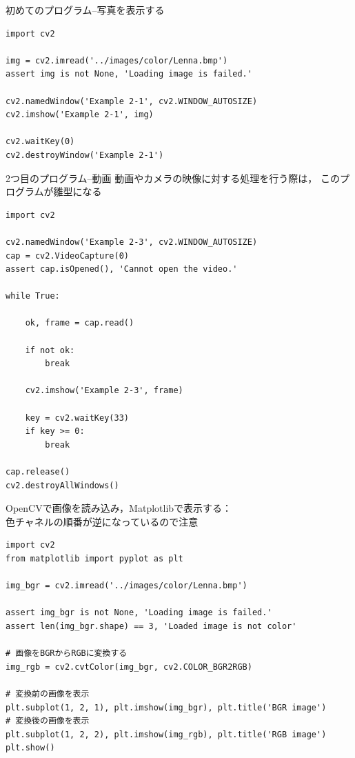 \documentclass[10pt]{beamer}
\begin{document}
	\begin{frame}[fragile]{初めてのプログラム--写真を表示する}

		\begin{verbatim}
import cv2

img = cv2.imread('../images/color/Lenna.bmp')
assert img is not None, 'Loading image is failed.'

cv2.namedWindow('Example 2-1', cv2.WINDOW_AUTOSIZE)
cv2.imshow('Example 2-1', img)

cv2.waitKey(0)
cv2.destroyWindow('Example 2-1')
		\end{verbatim}
	\end{frame}
	
	\begin{frame}[fragile]{2つ目のプログラム--動画}
		動画やカメラの映像に対する処理を行う際は，
		このプログラムが雛型になる

		\scriptsize
		\begin{verbatim}
import cv2

cv2.namedWindow('Example 2-3', cv2.WINDOW_AUTOSIZE)
cap = cv2.VideoCapture(0)
assert cap.isOpened(), 'Cannot open the video.'

while True:
    
    ok, frame = cap.read()

    if not ok:
        break
    
    cv2.imshow('Example 2-3', frame)
    
    key = cv2.waitKey(33)
    if key >= 0:
        break

cap.release()
cv2.destroyAllWindows()
		\end{verbatim}
	\end{frame}

	\begin{frame}[fragile]{OpenCVで画像を読み込み，Matplotlibで表示する：\\色チャネルの順番が逆になっているので注意}
		\scriptsize
		\begin{verbatim}
import cv2
from matplotlib import pyplot as plt

img_bgr = cv2.imread('../images/color/Lenna.bmp')

assert img_bgr is not None, 'Loading image is failed.'
assert len(img_bgr.shape) == 3, 'Loaded image is not color'

# 画像をBGRからRGBに変換する
img_rgb = cv2.cvtColor(img_bgr, cv2.COLOR_BGR2RGB) 

# 変換前の画像を表示
plt.subplot(1, 2, 1), plt.imshow(img_bgr), plt.title('BGR image')
# 変換後の画像を表示
plt.subplot(1, 2, 2), plt.imshow(img_rgb), plt.title('RGB image')
plt.show()
		\end{verbatim}
	\end{frame}
\end{document}
